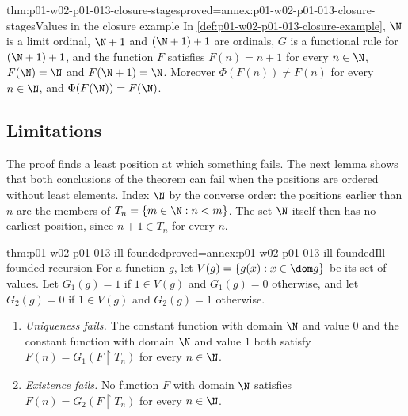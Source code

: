 \begin{hblemma}{thm:p01-w02-p01-013-closure-stages}{proved=annex:p01-w02-p01-013-closure-stages}{Values in the closure example}
In \cref{def:p01-w02-p01-013-closure-example}, \(\N\) is a limit ordinal,
\(\N+1\) and \((\N+1)+1\) are ordinals, \(G\) is a functional rule for
\((\N+1)+1\), and the function \(F\) satisfies \(F(n)=n+1\) for every
\(n\in\N\), \(F(\N)=\N\) and \(F(\N+1)=\N\). Moreover
\(\Phi(F(n))\ne F(n)\) for every \(n\in\N\), and \(\Phi(F(\N))=F(\N)\).
\end{hblemma}

\subsection{Limitations}
\label{sec:p01-w02-p01-013-limits}

The proof finds a least position at which something fails. The next lemma
shows that both conclusions of the theorem can fail when the positions are
ordered without least elements. Index \(\N\) by the converse order: the
positions earlier than \(n\) are the members of
\(T_n=\{m\in\N:n<m\}\). The set \(\N\) itself then has no earliest
position, since \(n+1\in T_n\) for every \(n\).

\begin{hblemma}{thm:p01-w02-p01-013-ill-founded}{proved=annex:p01-w02-p01-013-ill-founded}{Ill-founded recursion}
For a function \(g\), let \(V(g)=\{g(x):x\in\dom g\}\) be its set of values.
Let \(G_1(g)=1\) if \(1\in V(g)\) and \(G_1(g)=0\) otherwise, and let
\(G_2(g)=0\) if \(1\in V(g)\) and \(G_2(g)=1\) otherwise.
\begin{enumerate}
  \item \emph{Uniqueness fails.} The constant function with domain \(\N\)
        and value \(0\) and the constant function with domain \(\N\) and
        value \(1\) both satisfy
        \(F(n)=G_1(F\mathbin{\upharpoonright}T_n)\) for every \(n\in\N\).
  \item \emph{Existence fails.} No function \(F\) with domain \(\N\)
        satisfies \(F(n)=G_2(F\mathbin{\upharpoonright}T_n)\) for every
        \(n\in\N\).
\end{enumerate}
\end{hblemma}

